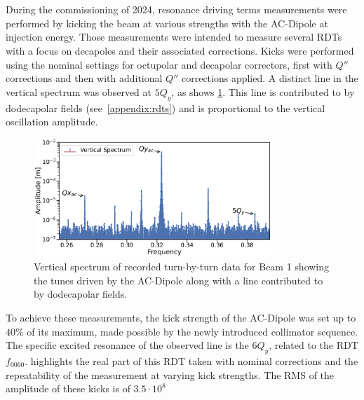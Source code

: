 \section{}


During the commissioning of 2024, resonance driving terms measurements were performed by kicking the
beam at various strengths with the AC-Dipole at injection energy. Those measurements were intended
to measure several RDTs with a focus on decapoles and their associated corrections. Kicks 
were performed using the nominal settings for octupolar and decapolar correctors, first with $Q''$
corrections and then with additional $Q''$ corrections applied.
A distinct line in the vertical spectrum was observed at $5Q_y$, as shows
\cref{fig:high_orders:spectrum_dodecapole_5qy}. This line is contributed to by dodecapolar fields
(see \cref{appendix:rdts}) and is proportional to the vertical oscillation amplitude.

\begin{figure}[!htb]
    \centering
    \includegraphics[width=0.8\textwidth]{./images/spectrum_dodecapole_5qy.pdf}
    \caption{Vertical spectrum of recorded turn-by-turn data for Beam 1 showing the tunes driven by the
    AC-Dipole along with a line contributed to by dodecapolar fields.}
    \label{fig:high_orders:spectrum_dodecapole_5qy}
\end{figure}

To achieve these measurements, the kick strength of the AC-Dipole was set up to $40\%$ of its
maximum, made possible by the newly introduced collimator sequence. The specific excited resonance
of the observed line is the $6Q_y$, related to the RDT $f_{0060}$.
 highlights the real part of this RDT taken with nominal
corrections and the repeatability of the measurement at varying kick strengths. The RMS of the
amplitude of these kicks is of $3.5\cdot10^8$

